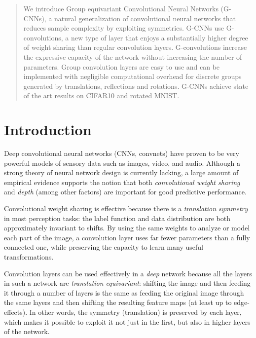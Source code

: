 \documentclass{article}
\begin{document}

\begin{abstract}
  We introduce Group equivariant Convolutional Neural Networks (G-CNNs), a natural generalization of convolutional neural networks that reduces sample complexity by exploiting symmetries.
  G-CNNs use G-convolutions, 
  a new type of layer that enjoys a substantially higher degree of weight sharing than regular convolution layers.
  G-convolutions increase the expressive capacity of the network without increasing the number of parameters.
  Group convolution layers are easy to use and can be implemented with negligible computational overhead for discrete groups generated by translations, reflections and rotations.
  G-CNNs achieve state of the art results on CIFAR10 and rotated MNIST.
\end{abstract}


\section{Introduction}
\label{sec:introduction}

Deep convolutional neural networks (CNNs, convnets) have proven to be very powerful models of sensory data such as images, video, and audio.
Although a strong theory of neural network design is currently lacking,
a large amount of empirical evidence supports the notion that both \emph{convolutional weight sharing} and \emph{depth} (among other factors) are important for good predictive performance.

Convolutional weight sharing is effective because there is a \emph{translation symmetry} in most perception tasks:
the label function and data distribution are both approximately invariant to shifts.
By using the same weights to analyze or model each part of the image,
a convolution layer uses far fewer parameters than a fully connected one, while preserving the capacity to learn many useful transformations.

Convolution layers can be used effectively in a \emph{deep} network because all the layers in such a network are \emph{translation equivariant}:
shifting the image and then feeding it through a number of layers is the same as feeding the original image through the same layers and then shifting the resulting feature maps (at least up to edge-effects).
In other words, the symmetry (translation) is preserved by each layer, which makes it possible to exploit it not just in the first, but also in higher layers of the network.
\end{document}
